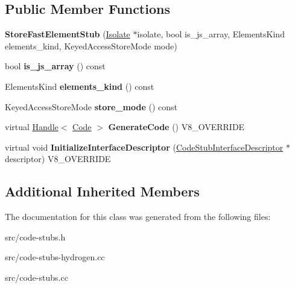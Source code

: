\subsection*{Public Member Functions}
\begin{DoxyCompactItemize}
\item 
\hypertarget{classv8_1_1internal_1_1_store_fast_element_stub_a0c9f3345e32d76dc53969cdddf57df46}{}{\bfseries Store\+Fast\+Element\+Stub} (\hyperlink{classv8_1_1internal_1_1_isolate}{Isolate} $\ast$isolate, bool is\+\_\+js\+\_\+array, Elements\+Kind elements\+\_\+kind, Keyed\+Access\+Store\+Mode mode)\label{classv8_1_1internal_1_1_store_fast_element_stub_a0c9f3345e32d76dc53969cdddf57df46}

\item 
\hypertarget{classv8_1_1internal_1_1_store_fast_element_stub_a0a043bba6634cf33f975526dfd4fa997}{}bool {\bfseries is\+\_\+js\+\_\+array} () const \label{classv8_1_1internal_1_1_store_fast_element_stub_a0a043bba6634cf33f975526dfd4fa997}

\item 
\hypertarget{classv8_1_1internal_1_1_store_fast_element_stub_a33755027028d35ce261cc544f63b4b40}{}Elements\+Kind {\bfseries elements\+\_\+kind} () const \label{classv8_1_1internal_1_1_store_fast_element_stub_a33755027028d35ce261cc544f63b4b40}

\item 
\hypertarget{classv8_1_1internal_1_1_store_fast_element_stub_a0e30fa4824ae7b549aae609619c56cc7}{}Keyed\+Access\+Store\+Mode {\bfseries store\+\_\+mode} () const \label{classv8_1_1internal_1_1_store_fast_element_stub_a0e30fa4824ae7b549aae609619c56cc7}

\item 
\hypertarget{classv8_1_1internal_1_1_store_fast_element_stub_ae9778b33c223404bf20289958fc5fcfb}{}virtual \hyperlink{classv8_1_1internal_1_1_handle}{Handle}$<$ \hyperlink{classv8_1_1internal_1_1_code}{Code} $>$ {\bfseries Generate\+Code} () V8\+\_\+\+O\+V\+E\+R\+R\+I\+D\+E\label{classv8_1_1internal_1_1_store_fast_element_stub_ae9778b33c223404bf20289958fc5fcfb}

\item 
\hypertarget{classv8_1_1internal_1_1_store_fast_element_stub_ac48525945d2665b9ccb220f369a10826}{}virtual void {\bfseries Initialize\+Interface\+Descriptor} (\hyperlink{classv8_1_1internal_1_1_code_stub_interface_descriptor}{Code\+Stub\+Interface\+Descriptor} $\ast$descriptor) V8\+\_\+\+O\+V\+E\+R\+R\+I\+D\+E\label{classv8_1_1internal_1_1_store_fast_element_stub_ac48525945d2665b9ccb220f369a10826}

\end{DoxyCompactItemize}
\subsection*{Additional Inherited Members}


The documentation for this class was generated from the following files\+:\begin{DoxyCompactItemize}
\item 
src/code-\/stubs.\+h\item 
src/code-\/stubs-\/hydrogen.\+cc\item 
src/code-\/stubs.\+cc\end{DoxyCompactItemize}
